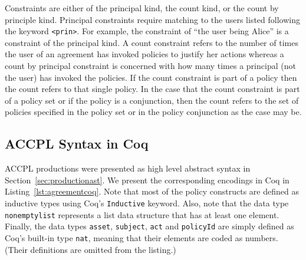 \documentclass[runningheads,a4paper]{llncs}
\newcommand{\syn}{\texttt}
\begin{document}
Constraints are either of the principal kind, the count kind, or the
count by principle kind. Principal constraints require matching to the users listed following the keyword \syn{<prin>}. For example, the
constraint of ``the user being Alice'' is a constraint of the
principal kind. A count constraint refers to the number of times the
user of an agreement has invoked policies to justify her actions whereas a count by principal constraint is concerned with how many times a principal (not the user) has invoked the policies. 
If the count constraint is part of a policy then the count refers to that
single policy. In the case that the count constraint is part of a
policy set or if the policy is a conjunction, then the count refers to
the set of policies specified in the policy set or in the policy
conjunction as the case may be.

\subsection{ACCPL Syntax in Coq}\label{sec:agreementConstructor}

\ac{ACCPL} productions were presented as high level abstract syntax in
Section~\ref{sec:productionast}. We present the corresponding
encodings in Coq in Listing~\ref{lst:agreementcoq}. Note that most of
the policy constructs are defined as inductive types using Coq's
\syn{Inductive} keyword. Also, note that the data type
\syn{nonemptylist} represents a list data structure that has at least
one element.  Finally, the data types \syn{asset}, \syn{subject},
\syn{act} and \syn{policyId} are simply defined as Coq's built-in type
\syn{nat}, meaning that their elements are coded as numbers. (Their
definitions are omitted from the listing.)
\end{document}
